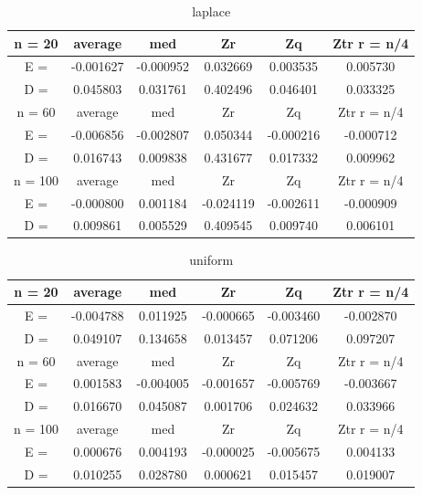 \documentclass[12pt]{report}
\begin{document}
\begin{table}[H]
\caption{laplace}
\label{tab:my_label3}
\begin{center}
\vspace{5mm}
\begin{tabular}{|c|c|c|c|c|c|}
\hline
n = 20    &average     &med         &Zr          &Zq          &Ztr r = n/4 \\
\hline
E =       &-0.001627   &-0.000952   &0.032669    &0.003535    &0.005730    \\
\hline
D =       &0.045803    &0.031761    &0.402496    &0.046401    &0.033325    \\
\hline
n = 60    &average     &med         &Zr          &Zq          &Ztr r = n/4 \\
\hline
E =       &-0.006856   &-0.002807   &0.050344    &-0.000216   &-0.000712   \\
\hline
D =       &0.016743    &0.009838    &0.431677    &0.017332    &0.009962    \\
\hline
n = 100   &average     &med         &Zr          &Zq          &Ztr r = n/4 \\
\hline
E =       &-0.000800   &0.001184    &-0.024119   &-0.002611   &-0.000909   \\
\hline
D =       &0.009861    &0.005529    &0.409545    &0.009740    &0.006101    \\
\hline
\end{tabular}
\end{center}
\end{table}

\begin{table}[H]
\caption{uniform}
\label{tab:my_label4}
\begin{center}
\vspace{5mm}
\begin{tabular}{|c|c|c|c|c|c|}
\hline
n = 20    &average     &med         &Zr          &Zq          &Ztr r = n/4 \\
\hline
E =       &-0.004788   &0.011925    &-0.000665   &-0.003460   &-0.002870   \\
\hline
D =       &0.049107    &0.134658    &0.013457    &0.071206    &0.097207    \\
\hline
n = 60    &average     &med         &Zr          &Zq          &Ztr r = n/4 \\
\hline
E =       &0.001583    &-0.004005   &-0.001657   &-0.005769   &-0.003667   \\
\hline
D =       &0.016670    &0.045087    &0.001706    &0.024632    &0.033966    \\
\hline
n = 100   &average     &med         &Zr          &Zq          &Ztr r = n/4 \\
\hline
E =       &0.000676    &0.004193    &-0.000025   &-0.005675   &0.004133    \\
\hline
D =       &0.010255    &0.028780    &0.000621    &0.015457    &0.019007    \\
\hline
\end{tabular}
\end{center}
\end{table}
\end{document}
